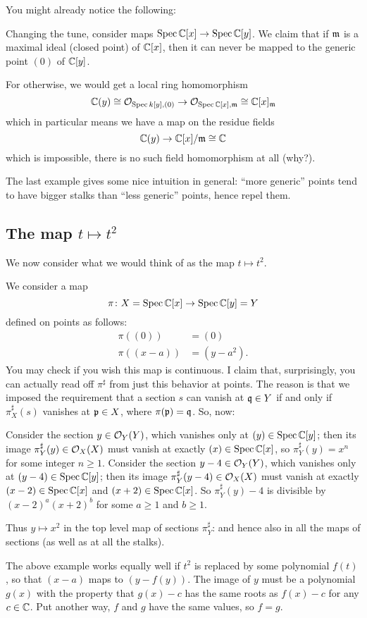 You might already notice the following:
\begin{example}
	Changing the tune, consider maps $\operatorname{Spec} \mathbb C[x] \to \operatorname{Spec} \mathbb C[y]$.
	We claim that if $\mathfrak m$ is a maximal ideal (closed point)
	of $\mathbb C[x]$, then it can never be mapped to the generic point $(0)$ of $\mathbb C[y]$.

	For otherwise, we would get a local ring homomorphism
	\[ \mathbb C(y) \cong \mathcal O_{\operatorname{Spec} k[y], (0)}
		\to \mathcal O_{\operatorname{Spec} \mathbb C[x], \mathfrak m} \cong \mathbb C[x]_\mathfrak m \]
	which in particular means we have a map on the residue fields
	\[ \mathbb C(y) \to \mathbb C[x] / \mathfrak m \cong \mathbb C \]
	which is impossible, there is no such field homomorphism at all (why?).
\end{example}
The last example gives some nice intuition in general:
``more generic'' points tend to have bigger stalks
than ``less generic'' points, hence repel them.

\subsection{The map $t \mapsto t^2$}
We now consider what we would think
of as the map $t \mapsto t^2$.
\begin{example}
	We consider a map
	\[ \pi \colon X = \operatorname{Spec} \mathbb C[x] \to \operatorname{Spec} \mathbb C[y] = Y \]
	defined on points as follows:
	\begin{align*}
		\pi\left( (0) \right) &= (0) \\
		\pi\left( (x-a)  \right) &= (y-a^2).
	\end{align*}
	You may check if you wish this map is continuous.
	I claim that, surprisingly,
	you can actually read off $\pi^\sharp$ from just this
	behavior at points.
	The reason is that we imposed the requirement
	that a section $s$ can vanish at $\mathfrak q \in Y$
	if and only if $\pi^\sharp_X(s)$ vanishes at $\mathfrak p \in X$,
	where $\pi(\mathfrak p) = \mathfrak q$.
	So, now:
	\begin{itemize}
		\ii Consider the section $y \in \mathcal O_Y(Y)$,
		which vanishes only at $(y) \in \operatorname{Spec} \mathbb C[y]$;
		then its image $\pi^\sharp_Y(y) \in \mathcal O_X(X)$
		must vanish at exactly $(x) \in \operatorname{Spec} \mathbb C[x]$,
		so $\pi^\sharp_Y(y) = x^n$ for some integer $n \ge 1$.
		\ii Consider the section $y-4 \in \mathcal O_Y(Y)$,
		which vanishes only at $(y-4) \in \operatorname{Spec} \mathbb C[y]$;
		then its image $\pi^\sharp_Y(y-4) \in \mathcal O_X(X)$
		must vanish at exactly $(x-2) \in \operatorname{Spec} \mathbb C[x]$
		and $(x+2) \in \operatorname{Spec} \mathbb C[x]$.
		So $\pi^\sharp_Y(y)-4$ is divisible by $(x-2)^a(x+2)^b$
		for some $a \ge 1$ and $b \ge 1$.
	\end{itemize}
	Thus $y \mapsto x^2$ in the top level map of sections $\pi^\sharp_Y$:
	and hence also in all the maps of sections
	(as well as at all the stalks).
\end{example}
The above example works equally well if $t^2$ is replaced
by some polynomial $f(t)$,
so that $(x-a)$ maps to $(y-f(y))$.
The image of $y$ must be a polynomial $g(x)$
with the property that $g(x)-c$ has the same roots as $f(x)-c$
for any $c \in \mathbb C$.
Put another way, $f$ and $g$ have the same values, so $f = g$.

